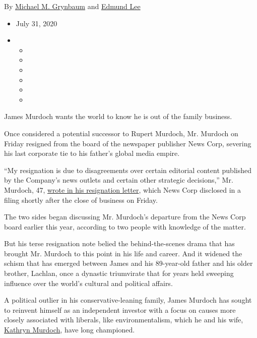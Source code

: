 By
\href{https://www.nytimes3xbfgragh.onion/by/michael-m-grynbaum}{Michael
M. Grynbaum} and
\href{https://www.nytimes3xbfgragh.onion/by/edmund-lee}{Edmund Lee}

\begin{itemize}
\item
  July 31, 2020
\item
  \begin{itemize}
  \item
  \item
  \item
  \item
  \item
  \item
  \end{itemize}
\end{itemize}

James Murdoch wants the world to know he is out of the family business.

Once considered a potential successor to Rupert Murdoch, Mr. Murdoch on
Friday resigned from the board of the newspaper publisher News Corp,
severing his last corporate tie to his father's global media empire.

``My resignation is due to disagreements over certain editorial content
published by the Company's news outlets and certain other strategic
decisions,'' Mr. Murdoch, 47,
\href{https://int.graylady3jvrrxbe.onion/data/documenttools/james-murdoch-s-resignation-letter/5d16f07153370f9d/full.pdf}{wrote
in his resignation letter}, which News Corp disclosed in a filing
shortly after the close of business on Friday.

The two sides began discussing Mr. Murdoch's departure from the News
Corp board earlier this year, according to two people with knowledge of
the matter.

But his terse resignation note belied the behind-the-scenes drama that
has brought Mr. Murdoch to this point in his life and career. And it
widened the schism that has emerged between James and his 89-year-old
father and his older brother, Lachlan, once a dynastic triumvirate that
for years held sweeping influence over the world's cultural and
political affairs.

A political outlier in his conservative-leaning family, James Murdoch
has sought to reinvent himself as an independent investor with a focus
on causes more closely associated with liberals, like environmentalism,
which he and his wife,
\href{https://www.nytimes3xbfgragh.onion/2019/09/26/climate/kathryn-murdoch-climate-change-voting.html}{Kathryn
Murdoch}, have long championed.

